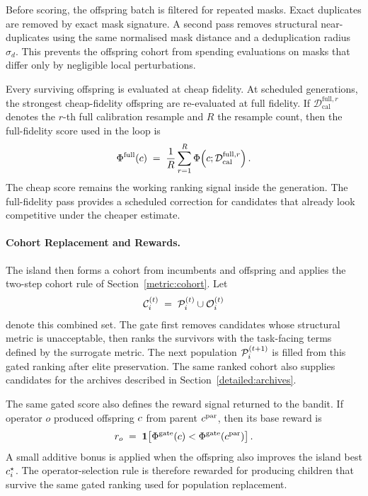 Before scoring, the offspring batch is filtered for repeated masks. Exact duplicates are removed by exact mask signature. A second pass removes structural near-duplicates using the same normalised mask distance and a deduplication radius $\sigma_d$. This prevents the offspring cohort from spending evaluations on masks that differ only by negligible local perturbations.

Every surviving offspring is evaluated at cheap fidelity. At scheduled generations, the strongest cheap-fidelity offspring are re-evaluated at full fidelity. If $\mathcal{D}_{\mathrm{cal}}^{\mathrm{full},r}$ denotes the $r$-th full calibration resample and $R$ the resample count, then the full-fidelity score used in the loop is
\[
\Phi^{\mathrm{full}}(c)
\;=\;
\frac{1}{R}\sum_{r=1}^{R} \Phi\!\left(c;\mathcal{D}_{\mathrm{cal}}^{\mathrm{full},r}\right).
\]
The cheap score remains the working ranking signal inside the generation. The full-fidelity pass provides a scheduled correction for candidates that already look competitive under the cheaper estimate.

\paragraph{Cohort Replacement and Rewards.}
The island then forms a cohort from incumbents and offspring and applies the two-step cohort rule of Section~\ref{metric:cohort}. Let
\[
\mathcal{C}_i^{(t)}
\;=\;
\mathcal{P}_i^{(t)} \cup \mathcal{O}_i^{(t)}
\]
denote this combined set. The gate first removes candidates whose structural metric is unacceptable, then ranks the survivors with the task-facing terms defined by the surrogate metric. The next population $\mathcal{P}_i^{(t+1)}$ is filled from this gated ranking after elite preservation. The same ranked cohort also supplies candidates for the archives described in Section~\ref{detailed:archives}.

The same gated score also defines the reward signal returned to the bandit. If operator $o$ produced offspring $c$ from parent $c^{\mathrm{par}}$, then its base reward is
\[
r_o
\;=\;
\mathbf{1}\!\left[
\Phi^{\mathrm{gate}}(c)
<
\Phi^{\mathrm{gate}}(c^{\mathrm{par}})
\right].
\]
A small additive bonus is applied when the offspring also improves the island best $c_i^\star$. The operator-selection rule is therefore rewarded for producing children that survive the same gated ranking used for population replacement.

